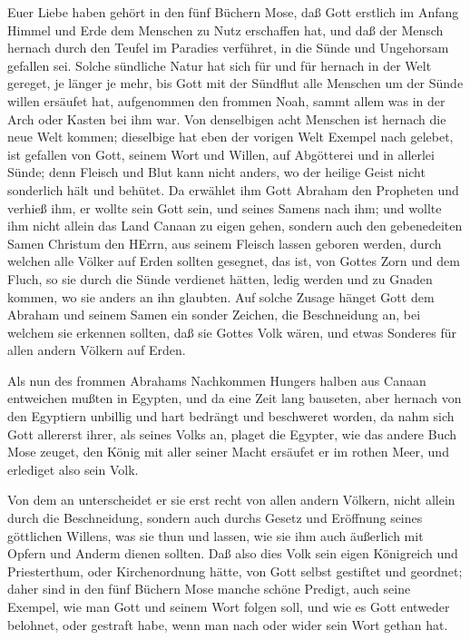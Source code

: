 Euer Liebe haben gehört in den fünf Büchern Mose, daß Gott erstlich im Anfang Himmel und Erde dem Menschen zu Nutz erschaffen hat, und daß der Mensch hernach durch den Teufel im Paradies verführet, in die Sünde und Ungehorsam gefallen sei. Solche sündliche Natur hat sich für und für hernach in der Welt gereget, je länger je mehr, bis Gott mit der Sündflut alle Menschen um der Sünde willen ersäufet hat, aufgenommen den frommen Noah, sammt allem was in der Arch oder Kasten bei ihm war. Von denselbigen acht Menschen ist hernach die neue Welt kommen; dieselbige hat eben der vorigen Welt Exempel nach gelebet, ist gefallen von Gott, seinem Wort und Willen, auf Abgötterei und in allerlei Sünde; denn Fleisch und Blut kann nicht anders, wo der heilige Geist nicht sonderlich hält und behütet. Da erwählet ihm Gott Abraham den Propheten und verhieß ihm, er wollte sein Gott sein, und seines Samens nach ihm; und wollte ihm nicht allein das Land Canaan zu eigen
gehen, sondern auch den gebenedeiten Samen Christum den HErrn, aus seinem Fleisch lassen geboren werden, durch welchen alle Völker auf Erden sollten gesegnet, das ist, von Gottes Zorn und dem Fluch, so sie durch die Sünde verdienet hätten, ledig werden und zu Gnaden kommen, wo sie anders an ihn glaubten. Auf solche Zusage hänget Gott dem Abraham und seinem Samen ein sonder Zeichen, die Beschneidung an, bei welchem sie erkennen sollten, daß sie Gottes Volk wären, und etwas Sonderes für allen andern Völkern auf Erden.

Als nun des frommen Abrahams Nachkommen Hungers halben aus Canaan entweichen mußten in Egypten, und da eine Zeit lang bauseten, aber hernach von den Egyptiern unbillig und hart bedrängt und beschweret worden, da nahm sich Gott allererst ihrer, als seines Volks an, plaget die Egypter, wie das andere Buch Mose zeuget, den König mit aller seiner Macht ersäufet er im rothen Meer, und erlediget also sein Volk.

Von dem an unterscheidet er sie erst recht von allen andern Völkern, nicht allein durch die Beschneidung, sondern auch durchs Gesetz und Eröffnung seines göttlichen Willens, was sie thun und lassen, wie sie ihm auch äußerlich mit Opfern und Anderm dienen sollten. Daß also dies Volk sein eigen Königreich und Priesterthum, oder Kirchenordnung hätte, von Gott selbst gestiftet und geordnet; daher sind in den fünf Büchern Mose manche schöne Predigt, auch seine Exempel, wie man Gott und seinem Wort folgen soll, und wie es Gott entweder belohnet, oder gestraft habe, wenn man nach oder wider sein Wort gethan hat.

